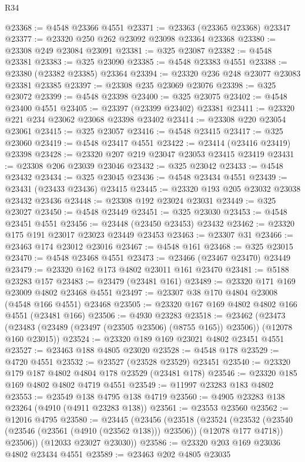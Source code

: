 \begin{lexlean}{R34}
\begin{coremodule}
@23368 := @4548 @23366 @4551
@23371 := @23363 (@23365 @23368) @23347
@23377 := @23320 @250 @262 @23092 @23098 @23364 @23368
@23380 := @23308 @249 @23084 @23091
@23381 := @325 @23087
@23382 := @4548 @23381
@23383 := @325 @23090
@23385 := @4548 @23383 @4551
@23388 := @23380 (@23382 @23385) @23364
@23394 := @23320 @236 @248 @23077 @23083 @23381 @23385
@23397 := @23308 @235 @23069 @23076
@23398 := @325 @23072
@23399 := @4548 @23398
@23400 := @325 @23075
@23402 := @4548 @23400 @4551
@23405 := @23397 (@23399 @23402) @23381
@23411 := @23320 @221 @234 @23062 @23068 @23398 @23402
@23414 := @23308 @220 @23054 @23061
@23415 := @325 @23057
@23416 := @4548 @23415
@23417 := @325 @23060
@23419 := @4548 @23417 @4551
@23422 := @23414 (@23416 @23419) @23398
@23428 := @23320 @207 @219 @23047 @23053 @23415 @23419
@23431 := @23308 @206 @23039 @23046
@23432 := @325 @23042
@23433 := @4548 @23432
@23434 := @325 @23045
@23436 := @4548 @23434 @4551
@23439 := @23431 (@23433 @23436) @23415
@23445 := @23320 @193 @205 @23032 @23038 @23432 @23436
@23448 := @23308 @192 @23024 @23031
@23449 := @325 @23027
@23450 := @4548 @23449
@23451 := @325 @23030
@23453 := @4548 @23451 @4551
@23456 := @23448 (@23450 @23453) @23432
@23462 := @23320 @175 @191 @23017 @23023 @23449 @23453
@23463 := @23307 @31
@23466 := @23463 @174 @23012 @23016
@23467 := @4548 @161
@23468 := @325 @23015
@23470 := @4548 @23468 @4551
@23473 := @23466 (@23467 @23470) @23449
@23479 := @23320 @162 @173 @4802 @23011 @161 @23470
@23481 := @5188 @23283 @157
@23483 := @23479 (@23481 @161)
@23489 := @23320 @171 @169 @23009 @4802 @23468 @4551
@23497 := @23307 @38 @170 @4804 @23008 (@4548 @166 @4551) @23468
@23505 := @23320 @167 @169 @4802 @4802 @166 @4551 (@23481 @166)
@23506 := @4930 @23283
@23518 := @23462
    (@23473 (@23483 (@23489 (@23497 (@23505 @23506) (@8755 @165)) @23506)) (@12078 @160 @23015))
@23524 := @23320 @189 @169 @23021 @4802 @23451 @4551
@23527 := @23463 @188 @4805 @23020
@23528 := @4548 @178
@23529 := @4720 @4551
@23532 := @23527 (@23528 @23529) @23451
@23540 := @23320 @179 @187 @4802 @4804 @178 @23529 (@23481 @178)
@23546 := @23320 @185 @169 @4802 @4802 @4719 @4551
@23549 := @11997 @23283 @183 @4802
@23553 := @23549 @138 @4795 @138 @4719
@23560 := @4905 @23283 @138 @23264 (@4910 (@4911 @23283 @138))
@23561 := @23553 @23560
@23562 := @12016 @4795
@23580 := @23445
    (@23456
      (@23518
        (@23524
          (@23532 (@23540 (@23546 (@23561 (@4910 (@23562 @138))) @23506)) (@12078 @177 @4718))
          @23506))
      (@12033 @23027 @23030))
@23586 := @23320 @203 @169 @23036 @4802 @23434 @4551
@23589 := @23463 @202 @4805 @23035

\end{coremodule}
\end{lexlean}
